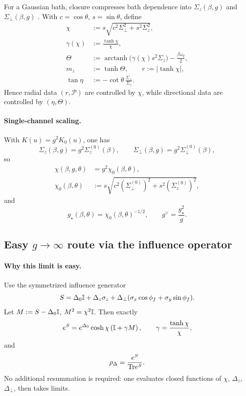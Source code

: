 For a Gaussian bath, closure compresses bath dependence into \(\Sigma_z(\beta,g)\) and
\(\Sigma_\perp(\beta,g)\)
\cite{cresserWeakUltrastrongCoupling2021a,cerisolaQuantumClassicalCorrespondence2024,mccaulMeanForceHamiltoniansInfluence2026}. With \(c=\cos\theta\), \(s=\sin\theta\), define
\begin{align}
  \chi &:= s\sqrt{c^2\Sigma_\perp^2+s^2\Sigma_z^2}, \\
  \gamma(\chi) &:= \frac{\tanh\chi}{\chi}, \\
  \Theta &:= \operatorname{arctanh}\!\big(\gamma(\chi)s^2\Sigma_z\big)-\frac{\beta\omega_q}{2}, \\
  m_z &:= \tanh\Theta,
  \qquad
  r := |\tanh\chi|, \\
  \tan\eta &:= -\cot\theta \,\frac{\Sigma_\perp}{\Sigma_z}.
\end{align}
Hence radial data \((r,\mathcal{P})\) are controlled by \(\chi\), while directional data are
controlled by \((\eta,\Theta)\).

\paragraph{Single-channel scaling.}
With \(K(u)=g^2K_0(u)\), one has
\begin{equation}
  \Sigma_z(\beta,g)=g^2\Sigma_z^{(0)}(\beta),
  \qquad
  \Sigma_\perp(\beta,g)=g^2\Sigma_\perp^{(0)}(\beta),
\end{equation}
so
\begin{align}
  \chi(\beta,g,\theta) &= g^2\chi_0(\beta,\theta), \\
  \chi_0(\beta,\theta) &:= s\sqrt{c^2(\Sigma_\perp^{(0)})^2+s^2(\Sigma_z^{(0)})^2},
\end{align}
and
\begin{equation}
  g_\star(\beta,\theta)=\chi_0(\beta,\theta)^{-1/2},
  \qquad
  g^\vee=\frac{g_\star^2}{g}.
\end{equation}

\subsection{\texorpdfstring{Easy \(g \to \infty\) route via the influence operator}{Easy g->infty route via the influence operator}}

\paragraph{Why this limit is easy.}
Use the symmetrized influence generator
\begin{equation}
  S = \Delta_0\mathbb{I} + \Delta_z \sigma_z + \Delta_\perp
  (\sigma_x\cos\phi_f + \sigma_y\sin\phi_f).
\end{equation}
Let \(M:=S-\Delta_0\mathbb{I}\), \(M^2=\chi^2\mathbb{I}\). Then exactly
\begin{equation}
  e^S = e^{\Delta_0}\cosh\chi\left(\mathbb{I}+\gamma M\right),
  \qquad \gamma=\frac{\tanh\chi}{\chi},
\end{equation}
and
\begin{equation}
  \rho_\Delta=\frac{e^S}{\mathrm{Tr} e^S}.
\end{equation}
No additional resummation is required: one evaluates closed functions of \(\chi\), \(\Delta_z\),
\(\Delta_\perp\), then takes limits.

